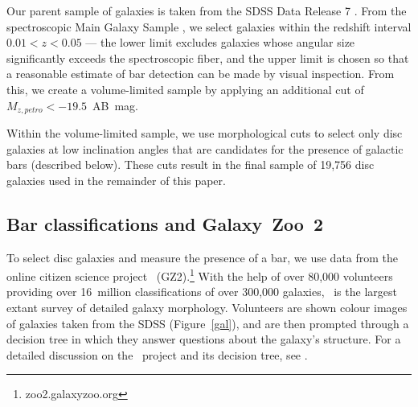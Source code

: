 Our parent sample of galaxies is taken from the SDSS Data Release 7 \citep{Abazajian09}. From the spectroscopic Main Galaxy Sample \citep{Strauss2002}, we select galaxies within the redshift interval $0.01<z<0.05$ --- the lower limit excludes galaxies whose angular size significantly exceeds the spectroscopic fiber, and the upper limit is chosen so that a reasonable estimate of bar detection can be made by visual inspection. From this, we create a volume-limited sample by applying an additional cut of $M_{z,petro} < -19.5$~AB~mag. 

Within the volume-limited sample, we use morphological cuts to select only disc galaxies at low inclination angles that are candidates for the presence of galactic bars (described below). These cuts result in the final sample of 19,756 disc galaxies used in the remainder of this paper. 

\subsection{Bar classifications and Galaxy~Zoo~2}
To select disc galaxies and measure the presence of a bar, we use data from the online citizen science project \gztwo~(GZ2).\footnote{zoo2.galaxyzoo.org} With the help of over 80,000 volunteers providing over 16~million classifications of over 300,000 galaxies, \gztwo~is the largest extant survey of detailed galaxy morphology. Volunteers are shown colour images of galaxies taken from the SDSS (Figure~\ref{gal}), and are then prompted through a decision tree in which they answer questions about the galaxy's structure. For a detailed discussion on the \gztwo~project and its decision tree, see \citet{Kyle}.



